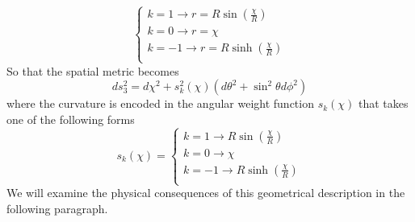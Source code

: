 \begin{displaymath}
\left \{ \begin{array}{l}k=1\rightarrow r=R\sin{\left(\frac{\chi}{R}\right)} \\ 
k=0\rightarrow r=\chi \\ 
k=-1 \rightarrow r=R\sinh{\left(\frac{\chi}{R}\right)} \\
 \end{array}  \right.  
\end{displaymath}
So that the spatial metric becomes 
\begin{equation}
ds_3^2=d\chi^2+s^2_k(\chi)(d\theta^2 + \sin^2{\theta}d\phi^2)
\end{equation}
where the curvature is encoded in the angular weight function $s_k(\chi)$ that takes one of the following forms 
\begin{displaymath}
s_k(\chi)=\left \{ \begin{array}{l}k=1\rightarrow R\sin{\left(\frac{\chi}{R}\right)} \\ 
k=0\rightarrow \chi \\ 
k=-1 \rightarrow R\sinh{\left(\frac{\chi}{R}\right)} \\
 \end{array}  \right.  
\end{displaymath}
We will examine the physical consequences of this geometrical description in the following paragraph. 

